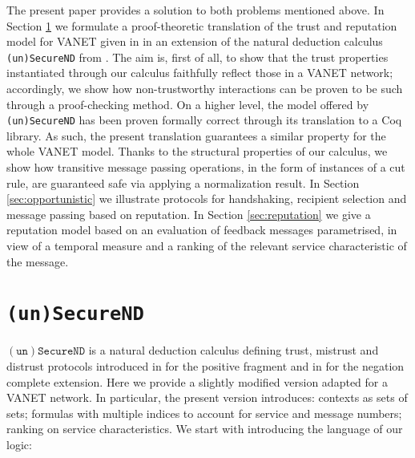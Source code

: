 \documentclass[compsoc, conference, letterpaper, 10pt, times]{IEEEtran}
\begin{document}
The present paper provides a solution to both problems mentioned above. In Section \ref{sec:logic} we formulate a proof-theoretic translation of the trust and reputation model for VANET given in \cite{glenford} in an extension of the natural deduction calculus \texttt{(un)SecureND} from \cite{DBLP:conf/ifiptm/Primiero16}. The aim is, first of all, to show that the trust properties instantiated through our calculus faithfully reflect those in a VANET network; accordingly, we show how non-trustworthy interactions can be proven to be such through a proof-checking method. On a higher level, the model offered by \texttt{(un)SecureND} has been proven formally correct through its translation to a Coq library. As such, the present translation guarantees a similar property for the whole VANET model. Thanks to the structural properties of our calculus, we show how transitive message passing operations, in the form of instances of a cut rule, are guaranteed safe via applying a normalization result. In Section \ref{sec:opportunistic} we illustrate protocols for handshaking, recipient selection and message passing based on reputation. In Section \ref{sec:reputation} we give a reputation model based on an evaluation of feedback messages parametrised, in view of a temporal measure and a ranking of the relevant service characteristic of the message.




\section{\texttt{(un)SecureND}}\label{sec:logic}

$\mathtt{(un)SecureND}$ is a natural deduction calculus defining trust, mistrust and distrust protocols introduced in \cite{primiero_secureND} for the positive fragment and in \cite{DBLP:conf/ifiptm/Primiero16} for the negation complete extension. Here we provide  a slightly modified version adapted for a VANET network. In particular, the present version introduces: contexts as sets of sets; formulas with multiple indices to account for service and message numbers; ranking on service characteristics. We start with introducing the language of our logic:
\end{document}
